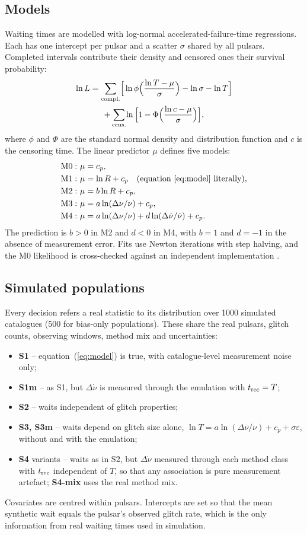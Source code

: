 \documentclass[fleqn,usenatbib]{mnras}
\newcommand{\dnu}{\Delta\nu/\nu}
\newcommand{\dnud}{\Delta\dot\nu/\dot\nu}
\begin{document}
\subsection{Models}
Waiting times are modelled with log-normal accelerated-failure-time
regressions. Each has one intercept per pulsar and a scatter $\sigma$
shared by all pulsars. Completed intervals contribute their density and
censored ones their survival probability:
\begin{multline}\label{eq:like}
\ln L=\sum_{\rm compl.}\!\Big[\ln\phi\Big(\frac{\ln T-\mu}{\sigma}\Big)
-\ln\sigma-\ln T\Big]\\
+\sum_{\rm cens.}\!\ln\Big[1-\Phi\Big(\frac{\ln c-\mu}{\sigma}\Big)\Big],
\end{multline}
where $\phi$ and $\Phi$ are the standard normal density and distribution
function and $c$ is the censoring time. The linear predictor $\mu$ defines
five models:
\begin{align}
{\rm M0}:&\ \mu=c_p, \nonumber\\
{\rm M1}:&\ \mu=\ln R+c_p\quad\text{(equation~\ref{eq:model} literally)},\nonumber\\
{\rm M2}:&\ \mu=b\ln R+c_p, \nonumber\\
{\rm M3}:&\ \mu=a\ln(\dnu)+c_p, \nonumber\\
{\rm M4}:&\ \mu=a\ln(\dnu)+d\ln(\dnud)+c_p. \nonumber
\end{align}
The prediction is $b>0$ in M2 and $d<0$ in M4, with $b=1$ and $d=-1$ in
the absence of measurement error. Fits use Newton iterations with step
halving, and the M0 likelihood is cross-checked against an independent
implementation \citep[\textsc{lifelines};][]{davidson2019}.

\subsection{Simulated populations}\label{sec:pops}
Every decision refers a real statistic to its distribution over 1000
simulated catalogues (500 for bias-only populations). These share the real
pulsars, glitch counts, observing windows, method mix and uncertainties:
\begin{itemize}
\item \textbf{S1} -- equation~(\ref{eq:model}) is true, with catalogue-level
measurement noise only;
\item \textbf{S1m} -- as S1, but $\Delta\dot\nu$ is measured through the
emulation with $t_{\rm rec}=T$;
\item \textbf{S2} -- waits independent of glitch properties;
\item \textbf{S3, S3m} -- waits depend on glitch size alone,
$\ln T=a\ln(\dnu)+c_p+\sigma\varepsilon$, without and with the emulation;
\item \textbf{S4} variants -- waits as in S2, but $\Delta\dot\nu$ measured
through each method class with $t_{\rm rec}$ independent of $T$, so that any
association is pure measurement artefact; \textbf{S4-mix} uses the real
method mix.
\end{itemize}
Covariates are centred within pulsars. Intercepts are set so that the mean
synthetic wait equals the pulsar's observed glitch rate, which is the only
information from real waiting times used in simulation.
\end{document}
